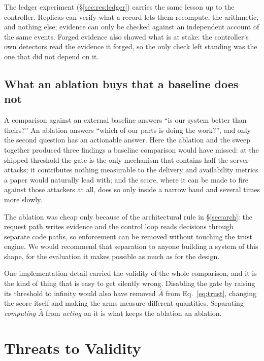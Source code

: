 \documentclass[10pt,twocolumn,letterpaper]{article}
\newcommand{\Agate}{\bar{A}}
\begin{document}
The ledger experiment (\S\ref{sec:res:ledger}) carries the same lesson up to
the controller. Replicas can verify what a record lets them recompute, the
arithmetic, and nothing else; evidence can only be checked against an
independent account of the same events. Forged evidence also showed what is
at stake: the controller's own detectors read the evidence it forged, so the
only check left standing was the one that did not depend on it.

\subsection{What an ablation buys that a baseline does not}
\label{sec:disc:ablation}
A comparison against an external baseline answers ``is our system better than
theirs?'' An ablation answers ``which of our parts is doing the work?'', and
only the second question has an actionable answer. Here the ablation and the
sweep together produced three findings a baseline comparison would have
missed: at the shipped threshold the gate is the only mechanism that contains
half the server attacks; it contributes nothing measurable to the delivery and
availability metrics a paper would naturally lead with; and the score, where it
can be made to fire against those attackers at all, does so only inside a
narrow band and several times more slowly.

The ablation was cheap only because of the architectural rule in
\S\ref{sec:arch}: the request path writes evidence and the control loop reads
decisions through separate code paths, so enforcement can be removed without
touching the trust engine. We would recommend that separation to anyone
building a system of this shape, for the evaluation it makes possible as much
as for the design.

One implementation detail carried the validity of the whole comparison, and it
is the kind of thing that is easy to get silently wrong. Disabling the gate by
raising its threshold to infinity would also have removed $\Agate$ from
Eq.~\ref{eq:trust}, changing the score itself and making the arms measure
different quantities. Separating \emph{computing} $\Agate$ from \emph{acting}
on it is what keeps the ablation an ablation.

\section{Threats to Validity}
\label{sec:validity}
\end{document}
